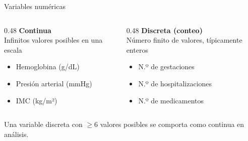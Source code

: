 \documentclass[aspectratio=169, 12pt, xcolor=table]{beamer}
\begin{document}
\begin{frame}{Variables numéricas}
  \begin{columns}[T]
    \begin{column}{0.48\textwidth}
      \textbf{\textcolor{accent}{Continua}}\\[4pt]
      Infinitos valores posibles en una escala\\[6pt]
      \begin{itemize}
        \item Hemoglobina (g/dL)
        \item Presión arterial (mmHg)
        \item IMC (kg/m²)
      \end{itemize}
    \end{column}
    \begin{column}{0.48\textwidth}
      \textbf{\textcolor{accent}{Discreta (conteo)}}\\[4pt]
      Número finito de valores, típicamente enteros\\[6pt]
      \begin{itemize}
        \item N.º de gestaciones
        \item N.º de hospitalizaciones
        \item N.º de medicamentos
      \end{itemize}
    \end{column}
  \end{columns}

  \vspace{8pt}
  \begin{nota}
    Una variable discreta con $\geq 6$ valores posibles se comporta como continua en análisis.
  \end{nota}
\end{frame}
\end{document}

